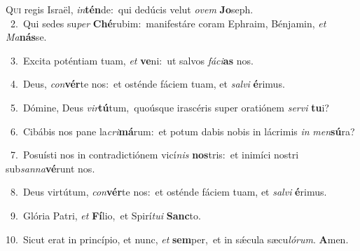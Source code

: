 \lettrine{\initial\textcolor{\initialcolor}{Q}}{ui} regis Israël, \textit{in}\-\textbf{tén}de:~\star qui dedúcis velut \textit{o}\-\textit{vem} \textbf{Jo}\-seph.\\
{\numbfont\textcolor{\numbcolor}{~2.}}~Qui sedes su\textit{per} \textbf{Ché}\-rubim:~\star manifestáre coram Ephraim, Bénjamin, \textit{et} \textit{Ma}\-\textbf{nás}se.\par
{\numbfont\textcolor{\numbcolor}{~3.}}~Excita poténtiam tuam, \textit{et} \textbf{ve}\-ni:~\star ut salvos \textit{fá}\-\textit{ci}\textbf{as} nos.\par
{\numbfont\textcolor{\numbcolor}{~4.}}~Deus, \textit{con}\-\textbf{vér}te nos:~\star et osténde fáciem tuam, et \textit{sal}\-\textit{vi} \textbf{é}\-rimus.\par
{\numbfont\textcolor{\numbcolor}{~5.}}~Dómine, Deus \textit{vir}\-\textbf{tú}tum,~\star quoúsque irascéris super oratiónem \textit{ser}\-\textit{vi} \textbf{tu}\-i?\par
{\numbfont\textcolor{\numbcolor}{~6.}}~Cibábis nos pane la\-\textit{cri}\-\textbf{má}rum:~\star et potum dabis nobis in lácrimis \textit{in} \textit{men}\-\textbf{sú}ra?\par
{\numbfont\textcolor{\numbcolor}{~7.}}~Posuísti nos in contradictiónem vicí\textit{nis} \textbf{nos}\-tris:~\star et inimíci nostri sub\-\textit{san}\-\textit{na}\textbf{vé}runt nos.\par
{\numbfont\textcolor{\numbcolor}{~8.}}~Deus virtútum, \textit{con}\-\textbf{vér}te nos:~\star et osténde fáciem tuam, et \textit{sal}\-\textit{vi} \textbf{é}\-rimus.\par
{\numbfont\textcolor{\numbcolor}{~9.}}~Glória Patri, \textit{et} \textbf{Fí}\-lio,~\star et Spirí\-\textit{tu}\-\textit{i} \textbf{Sanc}\-to.\par
{\numbfont\textcolor{\numbcolor}{10.}}~Sicut erat in princípio, et nunc, \textit{et} \textbf{sem}\-per,~\star et in sǽcula sæcu\-\textit{ló}\-\textit{rum}. \textbf{A}\-men.\par
